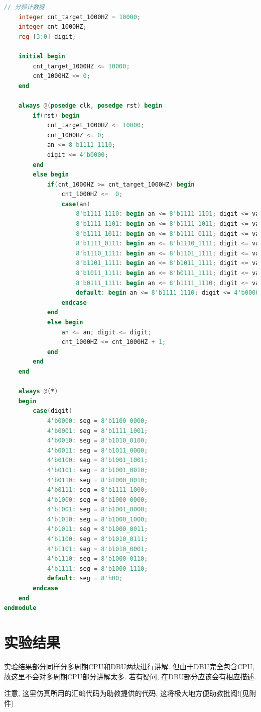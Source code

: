 \documentclass[UTF8]{article}
\begin{document}
\begin{enumerate}
\begin{lstlisting}[language=verilog]
    // 分频计数器
    integer cnt_target_1000HZ = 10000;
    integer cnt_1000HZ;
    reg [3:0] digit;
    
    initial begin
        cnt_target_1000HZ <= 10000;
        cnt_1000HZ <= 0;
    end
    
    always @(posedge clk, posedge rst) begin
        if(rst) begin
            cnt_target_1000HZ <= 10000;
            cnt_1000HZ <= 0;
            an <= 8'b1111_1110;
            digit <= 4'b0000;
        end
        else begin
            if(cnt_1000HZ >= cnt_target_1000HZ) begin
                cnt_1000HZ <=  0;
                case(an)
                    8'b1111_1110: begin an <= 8'b1111_1101; digit <= value[31:27]; end
                    8'b1111_1101: begin an <= 8'b1111_1011; digit <= value[3:0]; end
                    8'b1111_1011: begin an <= 8'b1111_0111; digit <= value[7:3]; end
                    8'b1111_0111: begin an <= 8'b1110_1111; digit <= value[11:7]; end
                    8'b1110_1111: begin an <= 8'b1101_1111; digit <= value[15:11]; end
                    8'b1101_1111: begin an <= 8'b1011_1111; digit <= value[19:15]; end
                    8'b1011_1111: begin an <= 8'b0111_1111; digit <= value[23:19]; end
                    8'b0111_1111: begin an <= 8'b1111_1110; digit <= value[27:23]; end
                    default: begin an <= 8'b1111_1110; digit <= 4'b0000; end
                endcase
            end
            else begin
                an <= an; digit <= digit;
                cnt_1000HZ <= cnt_1000HZ + 1;
            end
        end
    end
    
    always @(*)
    begin
        case(digit)
            4'b0000: seg = 8'b1100_0000;
            4'b0001: seg = 8'b1111_1001;
            4'b0010: seg = 8'b1010_0100;
            4'b0011: seg = 8'b1011_0000;
            4'b0100: seg = 8'b1001_1001;
            4'b0101: seg = 8'b1001_0010;
            4'b0110: seg = 8'b1000_0010;
            4'b0111: seg = 8'b1111_1000;
            4'b1000: seg = 8'b1000_0000;
            4'b1001: seg = 8'b1001_0000;
            4'b1010: seg = 8'b1000_1000;
            4'b1011: seg = 8'b1000_0011;
            4'b1100: seg = 8'b1010_0111;
            4'b1101: seg = 8'b1010_0001;
            4'b1110: seg = 8'b1000_0110;
            4'b1111: seg = 8'b1000_1110;
            default: seg = 8'h00;
        endcase
    end
endmodule
	\end{lstlisting}
\end{enumerate}

\section{实验结果}
实验结果部分同样分多周期CPU和DBU两块进行讲解. 但由于DBU完全包含CPU, 故这里不会对多周期CPU部分讲解太多. 若有疑问, 在DBU部分应该会有相应描述.\par
注意, 这里仿真所用的汇编代码为助教提供的代码, 这将极大地方便助教批阅!(见附件)\par
\end{document}
